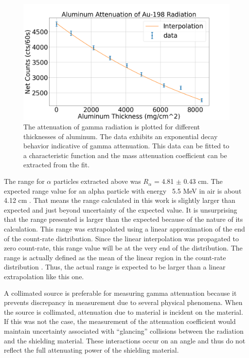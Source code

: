 \begin{figure}
\centering
\includegraphics[width=\textwidth]{Al.png}
\caption{The attenuation of gamma radiation is plotted for different thicknesses of aluminum. The data exhibits an exponential decay behavior indicative of gamma attenuation. This data can be fitted to a characteristic function and the mass attenuation coefficient can be extracted from the fit.}
\label{fig:Al}
\end{figure}

The range for $\alpha$ particles extracted above was $R_{\alpha}$ = 4.81 $\pm$ 0.43 cm. The expected range value for an alpha particle with energy ~5.5 MeV in air is about 4.12 cm \cite{nistrange}. That means the range calculated in this work is slightly larger than expected and just beyond uncertainty of the expected value. It is unsurprising that the range presented is larger than the expected because of the nature of its calculation. This range was extrapolated using a linear approximation of the end of the count-rate distribution. Since the linear interpolation was propagated to zero count-rate, this range value will be at the very end of the distribution. The range is actually defined as the mean of the linear region in the count-rate distribution \cite{knoll}. Thus, the actual range is expected to be larger than a linear extrapolation like this one.

A collimated source is preferable for measuring gamma attenuation because it prevents discrepancy in measurement due to several physical phenomena. When the source is collimated, attenuation due to material is incident on the material. If this was not the case, the measurement of the attenuation coefficient would maintain uncertainty associated with “glancing” collisions between the radiation and the shielding material. These interactions occur on an angle and thus do not reflect the full attenuating power of the shielding material.

